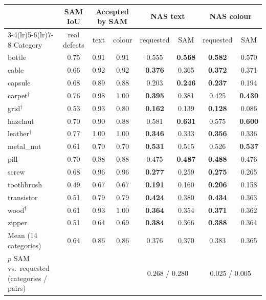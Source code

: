 \begin{tabular}{@{}l c c c c c c c@{}}
\toprule
 & SAM IoU & \multicolumn{2}{c}{Accepted by SAM} & \multicolumn{2}{c}{NAS text} & \multicolumn{2}{c}{NAS colour} \\
\cmidrule(lr){3-4}\cmidrule(lr){5-6}\cmidrule(lr){7-8}
Category & real defects & text & colour & requested & SAM & requested & SAM \\
\midrule
bottle & 0.75 & 0.91 & 0.91 & 0.555 & \textbf{0.568} & \textbf{0.582} & 0.570 \\
cable & 0.66 & 0.92 & 0.92 & \textbf{0.376} & 0.365 & \textbf{0.372} & 0.371 \\
capsule & 0.68 & 0.89 & 0.88 & 0.203 & \textbf{0.246} & \textbf{0.237} & 0.194 \\
carpet$^\dagger$ & 0.76 & 0.98 & 1.00 & \textbf{0.395} & 0.381 & 0.425 & \textbf{0.430} \\
grid$^\dagger$ & 0.53 & 0.93 & 0.80 & \textbf{0.162} & 0.139 & \textbf{0.128} & 0.086 \\
hazelnut & 0.70 & 0.90 & 0.88 & 0.581 & \textbf{0.631} & 0.575 & \textbf{0.600} \\
leather$^\dagger$ & 0.77 & 1.00 & 1.00 & \textbf{0.346} & 0.333 & \textbf{0.356} & 0.336 \\
metal\_nut & 0.61 & 0.70 & 0.70 & \textbf{0.531} & 0.515 & 0.526 & \textbf{0.537} \\
pill & 0.70 & 0.88 & 0.88 & 0.475 & \textbf{0.487} & \textbf{0.488} & 0.476 \\
screw & 0.68 & 0.96 & 0.96 & \textbf{0.277} & 0.259 & \textbf{0.275} & 0.265 \\
toothbrush & 0.49 & 0.67 & 0.67 & \textbf{0.191} & 0.160 & \textbf{0.206} & 0.158 \\
transistor & 0.51 & 0.79 & 0.79 & \textbf{0.424} & 0.380 & \textbf{0.434} & 0.363 \\
wood$^\dagger$ & 0.61 & 0.93 & 1.00 & \textbf{0.364} & 0.354 & \textbf{0.371} & 0.362 \\
zipper & 0.51 & 0.64 & 0.69 & \textbf{0.384} & 0.366 & \textbf{0.388} & 0.364 \\
\midrule
Mean (14 categories) & 0.64 & 0.86 & 0.86 & 0.376 & 0.370 & 0.383 & 0.365 \\
$p$ SAM vs.\ requested (categories / pairs) & & & & \multicolumn{2}{c}{0.268 / 0.280} & \multicolumn{2}{c}{0.025 / 0.005} \\
\bottomrule
\end{tabular}
